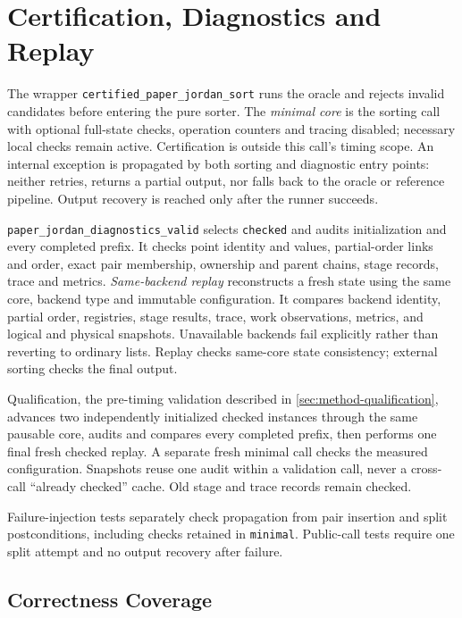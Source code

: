 \section{Certification, Diagnostics and Replay}
\label{sec:implementation-certification}
\label{sec:implementation-validation}

The wrapper \texttt{certified\_paper\_jordan\_sort} runs the oracle and
rejects invalid candidates before entering the pure sorter. The \emph{minimal
core} is the sorting call with optional full-state checks, operation counters
and tracing disabled; necessary local checks remain active. Certification is
outside this call's timing scope. An internal exception is propagated
by both sorting and diagnostic entry points: neither retries, returns a
partial output, nor falls back to the oracle or reference pipeline. Output
recovery is reached only after the runner succeeds.

\texttt{paper\_jordan\_diagnostics\_valid} selects \texttt{checked} and audits
initialization and every completed prefix. It checks point identity and
values, partial-order links and order, exact pair membership, ownership and
parent chains, stage records, trace and metrics. \emph{Same-backend replay}
reconstructs a fresh state using the same core, backend type and immutable
configuration. It compares backend identity, partial order, registries, stage
results, trace, work observations, metrics, and logical and physical snapshots.
Unavailable backends fail explicitly rather than reverting to ordinary lists.
Replay checks same-core state consistency; external sorting checks the final
output.

Qualification, the pre-timing validation described in
\cref{sec:method-qualification}, advances two independently initialized checked
instances through the same pausable core, audits and compares every completed
prefix, then performs one final fresh checked replay. A separate fresh minimal
call checks the measured configuration.
Snapshots reuse one audit within a validation call, never a cross-call
``already checked'' cache. Old stage and trace records remain checked.

Failure-injection tests separately check propagation from pair insertion and
split postconditions, including checks retained in \texttt{minimal}.
Public-call tests require one split attempt and no output recovery after
failure.

\subsection{Correctness Coverage}
\label{sec:implementation-coverage}

